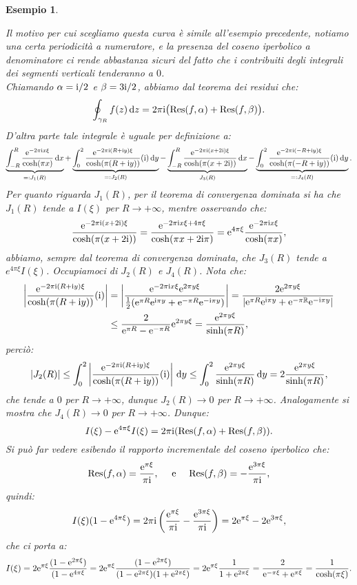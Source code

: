 \documentclass[11pt]{book}
\theoremstyle{Definizione}
\theoremstyle{TeoremaProposizioneLemmaCorollarioCongettura}
\theoremstyle{OsservazioneNotaEsempio}
\newtheorem{myes}{Esempio}[section]
\newcommand{\R}{\mathbb{R}}
\renewcommand{\i}{\textup{i}}
\newcommand{\e}{\textup{e}}
\renewcommand{\d}{\mathrm{d}}
\newcommand{\dz}{\,\d z}
\newcommand{\dx}{\,\d x}
\newcommand{\dy}{\,\d y}
\newcommand{\Res}{\textup{Res}}
\begin{document}
\begin{myes}
\begin{center}
\end{center}
Il motivo per cui scegliamo questa curva è simile all'esempio precedente, notiamo una certa periodicità a numeratore, e la presenza del coseno iperbolico a denominatore ci rende abbastanza sicuri del fatto che i contribuiti degli integrali dei segmenti verticali tenderanno a $0$.\\
Chiamando $\alpha = \i/2$ e $\beta = 3\i/2$, abbiamo dal teorema dei residui che:
$$
\oint_{\gamma_R} f(z)\dz = 2\pi\i\big(\Res(f,\alpha)+\Res(f,\beta)\big).
$$
D'altra parte tale integrale è uguale per definizione a:
$$
\underbrace{\int_{-R}^{R} \frac{\e^{-2\pi\i x \xi}}{\cosh(\pi x)}\dx}_{=:J_1(R)} + \underbrace{\int_0^2 \frac{\e^{-2\pi\i (R+\i y) \xi}}{\cosh(\pi (R+\i y))}(\i)\dy}_{=: J_2(R)} - \underbrace{\int_{-R}^{R} \frac{\e^{-2\pi\i (x+2\i) \xi}}{\cosh(\pi (x+2\i))}\dx}_{J_3(R)} - \underbrace{\int_0^2 \frac{\e^{-2\pi\i (-R+\i y) \xi}}{\cosh(\pi (-R+\i y))}(\i)\dy}_{=: J_4(R)}.
$$
Per quanto riguarda $J_1(R)$, per il teorema di convergenza dominata si ha che $J_1(R)$ tende a $I(\xi)$ per $R \to +\infty$, mentre osservando che:
$$
\frac{\e^{-2\pi\i (x+2\i) \xi}}{\cosh(\pi (x+2\i))} = \frac{\e^{-2\pi \i x\xi+4\pi \xi }}{\cosh(\pi x + 2\i\pi)} = \e^{4\pi\xi}\frac{\e^{-2\pi\i x \xi}}{\cosh(\pi x)},
$$
abbiamo, sempre dal teorema di convergenza dominata, che $J_3(R)$ tende a $e^{4\pi\xi} I(\xi)$. Occupiamoci di $J_2(R)$ e $J_4(R)$. Nota che:
\begin{align*}
\left|\frac{\e^{-2\pi\i (R+\i y) \xi}}{\cosh(\pi (R+\i y))}(\i)\right| &= \left|\frac{\e^{-2\pi\i x \xi}\e^{2\pi y \xi}}{\frac{1}{2}(\e^{\pi R}\e^{\i\pi y} + \e^{-\pi R}\e^{-\i\pi y})}\right| = \frac{2\e^{2\pi y \xi}}{|\e^{\pi R}\e^{\i\pi y} + \e^{-\pi \R}\e^{-\i\pi y}|} \\
&\leq \frac{2}{\e^{\pi R}- \e^{-\pi R}} \e^{2\pi y \xi} = \frac{\e^{2\pi y \xi}}{\sinh(\pi R)},
\end{align*}
perciò:
$$
|J_2(R)| \leq \int_0^2 \left|\frac{\e^{-2\pi\i (R+\i y) \xi}}{\cosh(\pi (R+\i y))}(\i)\right|\dy \leq \int_0^2 \frac{\e^{2\pi y \xi}}{\sinh(\pi R)} \dy = 2 \frac{\e^{2\pi y \xi}}{\sinh(\pi R)},
$$
che tende a $0$ per $R \to +\infty$, dunque $J_2(R) \to 0$ per $R \to +\infty$. Analogamente si mostra che $J_4(R) \to 0$ per $R \to +\infty$. Dunque:
$$
I(\xi) - \e^{4\pi \xi} I(\xi) = 2\pi\i(\Res(f,\alpha)+\Res(f,\beta)).
$$
Si può far vedere esibendo il rapporto incrementale del coseno iperbolico che:
$$
\Res(f,\alpha) = \frac{\e^{\pi \xi}}{\pi \i},\quad \textup{ e }\quad\Res(f,\beta) = -\frac{\e^{3 \pi \xi}}{\pi \i},
$$
quindi:
$$
I(\xi) (1-\e^{4\pi \xi}) = 2\pi\i \left(\frac{\e^{\pi \xi}}{\pi \i}-\frac{\e^{3 \pi \xi}}{\pi \i}\right) = 2\e^{\pi \xi} - 2\e^{3\pi\xi},
$$
che ci porta a:
$$
I(\xi) = 2\e^{\pi \xi} \frac{(1-\e^{2\pi\xi})}{(1-\e^{4\pi\xi}} =  2\e^{\pi \xi} \frac{(1-\e^{2\pi\xi})}{(1-\e^{2\pi\xi})(1+\e^{2\pi\xi})} = 2\e^{\pi\xi} \frac{1}{1+\e^{2\pi\xi}} = \frac{2}{\e^{-\pi\xi}+\e^{\pi\xi}} = \frac{1}{\cosh(\pi \xi)}.
$$
\end{myes}
\end{document}
